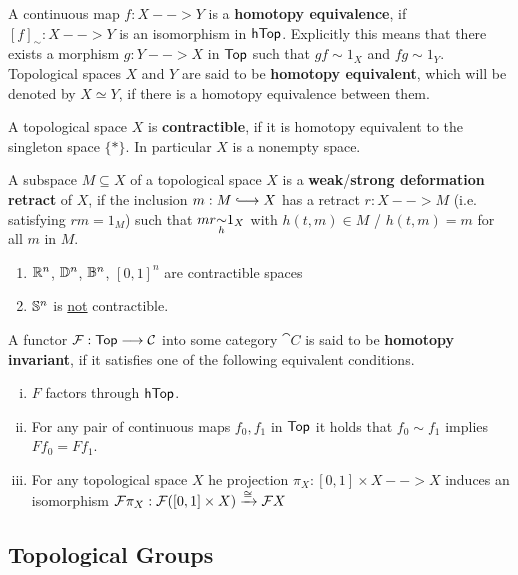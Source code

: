 \begin{definition}
	A continuous map $f:X-->Y$ is a \textbf{homotopy equivalence}, if $[f]_\sim: X --> Y$ is an isomorphism in $\ncat{hTop}$. Explicitly this means that there exists a morphism $g:Y --> X$ in $\ncat{Top}$ such that $gf \sim 1_X$ and $fg \sim 1_Y$. Topological spaces $X$ and $Y$ are said to be \textbf{homotopy equivalent}, which will be denoted by $X \simeq Y$, if there is a homotopy equivalence between them.

	A topological space $X$ is \textbf{contractible}, if it is homotopy equivalent to the singleton space $\{*\}$. In particular $X$ is a nonempty space.

	A subspace $M \subseteq X$ of a topological space $X$ is a \textbf{weak}/\textbf{strong deformation retract} of $X$, if the inclusion $m:M \longrightincl X$ has a retract $r:X --> M$ (i.e. satisfying $rm = 1_M$) such that $mr \smash{\underset{h}{\sim}} 1_X$ with $h(t,m) \in M$ / $h(t,m) = m$ for all $m$ in $M$.
\end{definition}

\begin{example}\vspace{-2em}
	\begin{enumerate}
		\item{
			$\R^n$, $\D^n$, $\B^n$, $[0,1]^n$ are contractible spaces
		}
		\item{
			$\S^n$ is \underline{not} contractible.
		}
	\end{enumerate}
\end{example}

\begin{definition}
	A functor $\fun{F}:\ncat{Top} --> \cat{C}$ into some category $\cat{C}$ is said to be \textbf{homotopy invariant}, if it satisfies one of the following equivalent conditions.
	\begin{enumerate}[(i)]
		\item{
			$F$ factors through $\ncat{hTop}$.
		}
		\item{
			For any pair of continuous maps $f_0,f_1$ in $\ncat{Top}$ it holds that $f_0 \sim f_1$ implies $Ff_0 = Ff_1$.
		}
		\item{
			For any topological space $X$ he projection $\pi_X:[0,1]\times X --> X$ induces an isomorphism $\fun{F}\pi_X: \fun{F}([0,1]\times X) \xrightarrow{\isom} \fun{F}X$
		}
	\end{enumerate}
\end{definition}


\subsection{Topological Groups}

